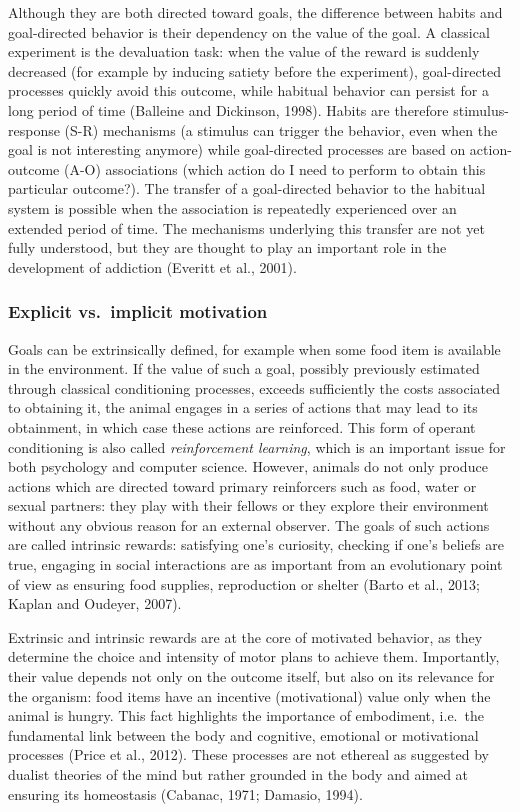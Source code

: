 \documentclass[
  11pt,
  a4paper,
]{scrbook}
\begin{document}
Although they are both directed toward goals, the difference between
habits and goal-directed behavior is their dependency on the value of
the goal. A classical experiment is the devaluation task: when the value
of the reward is suddenly decreased (for example by inducing satiety
before the experiment), goal-directed processes quickly avoid this
outcome, while habitual behavior can persist for a long period of time
(Balleine and Dickinson, 1998). Habits are therefore stimulus-response
(S-R) mechanisms (a stimulus can trigger the behavior, even when the
goal is not interesting anymore) while goal-directed processes are based
on action-outcome (A-O) associations (which action do I need to perform
to obtain this particular outcome?). The transfer of a goal-directed
behavior to the habitual system is possible when the association is
repeatedly experienced over an extended period of time. The mechanisms
underlying this transfer are not yet fully understood, but they are
thought to play an important role in the development of addiction
(Everitt et al., 2001).

\subsubsection*{Explicit vs.~implicit
motivation}\label{explicit-vs.-implicit-motivation}

Goals can be extrinsically defined, for example when some food item is
available in the environment. If the value of such a goal, possibly
previously estimated through classical conditioning processes, exceeds
sufficiently the costs associated to obtaining it, the animal engages in
a series of actions that may lead to its obtainment, in which case these
actions are reinforced. This form of operant conditioning is also called
\emph{reinforcement learning}, which is an important issue for both
psychology and computer science. However, animals do not only produce
actions which are directed toward primary reinforcers such as food,
water or sexual partners: they play with their fellows or they explore
their environment without any obvious reason for an external observer.
The goals of such actions are called intrinsic rewards: satisfying one's
curiosity, checking if one's beliefs are true, engaging in social
interactions are as important from an evolutionary point of view as
ensuring food supplies, reproduction or shelter (Barto et al., 2013;
Kaplan and Oudeyer, 2007).

Extrinsic and intrinsic rewards are at the core of motivated behavior,
as they determine the choice and intensity of motor plans to achieve
them. Importantly, their value depends not only on the outcome itself,
but also on its relevance for the organism: food items have an incentive
(motivational) value only when the animal is hungry. This fact
highlights the importance of embodiment, i.e.~the fundamental link
between the body and cognitive, emotional or motivational processes
(Price et al., 2012). These processes are not ethereal as suggested by
dualist theories of the mind but rather grounded in the body and aimed
at ensuring its homeostasis (Cabanac, 1971; Damasio, 1994).
\end{document}
